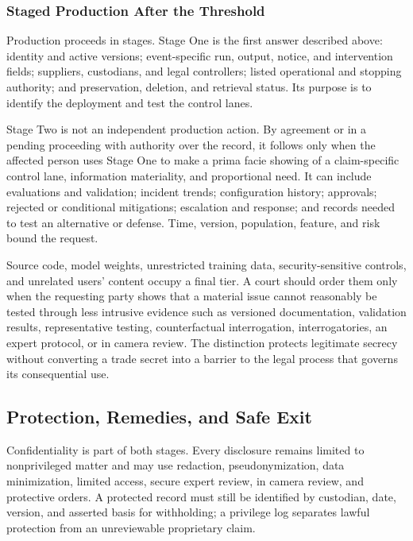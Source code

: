 \subsubsection{Staged Production After the Threshold}

Production proceeds in stages. Stage One is the first answer described above: identity and active versions; event-specific run, output, notice, and intervention fields; suppliers, custodians, and legal controllers; listed operational and stopping authority; and preservation, deletion, and retrieval status. Its purpose is to identify the deployment and test the control lanes.

Stage Two is not an independent production action. By agreement or in a pending proceeding with authority over the record, it follows only when the affected person uses Stage One to make a prima facie showing of a claim-specific control lane, information materiality, and proportional need. It can include evaluations and validation; incident trends; configuration history; approvals; rejected or conditional mitigations; escalation and response; and records needed to test an alternative or defense. Time, version, population, feature, and risk bound the request.

Source code, model weights, unrestricted training data, security-sensitive controls, and unrelated users' content occupy a final tier. A court should order them only when the requesting party shows that a material issue cannot reasonably be tested through less intrusive evidence such as versioned documentation, validation results, representative testing, counterfactual interrogation, interrogatories, an expert protocol, or in camera review. The distinction protects legitimate secrecy without converting a trade secret into a barrier to the legal process that governs its consequential use.

\subsection{Protection, Remedies, and Safe Exit}
\label{sec:remedies}

Confidentiality is part of both stages. Every disclosure remains limited to nonprivileged matter and may use redaction, pseudonymization, data minimization, limited access, secure expert review, in camera review, and protective orders. A protected record must still be identified by custodian, date, version, and asserted basis for withholding; a privilege log separates lawful protection from an unreviewable proprietary claim.

